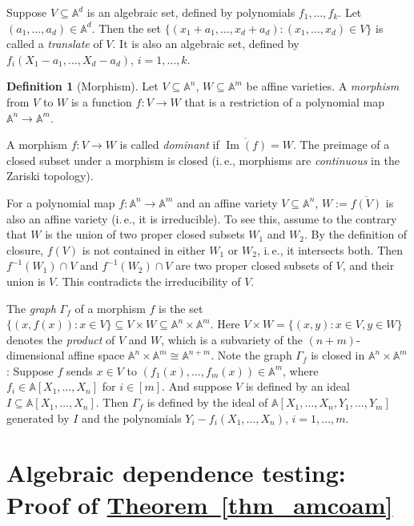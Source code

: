 \documentclass[11pt]{article}
\numberwithin{equation}{section}
\theoremstyle{definition}
\newtheorem{definition}[theorem]{Definition}
\theoremstyle{plain}
\newcommand{\ie}{i.\,e.}
\newcommand{\expref}[2]{\hyperref[#2]{#1~\ref{#2}}}
\newcommand{\aff}{\mathbb{A}}
\DeclareMathOperator{\im}{\mathrm{Im}}
\begin{document}
%
Suppose $V\subseteq\aff^d$ is an algebraic set, defined by polynomials $f_1,\dots,f_k$. Let $(a_1,\dots,a_d)\in\aff^d$. Then the set $\{(x_1+a_1,\dots,x_d+a_d): (x_1,\dots,x_d)\in V\}$ is called a \emph{translate} of $V$. It is also an algebraic set, defined by $f_i(X_1-a_1,\dots,X_d-a_d)$, $i=1,\dots,k$.

%
\begin{definition}[Morphism] %
Let $V\subseteq \aff^n$, $W\subseteq\aff^m$ be affine varieties. A \emph{morphism} from $V$ to $W$ is a function $f:V\to W$ that is a restriction of a polynomial map $\aff^n\to\aff^m$.
\end{definition}

A morphism $f: V\to W$ is called \emph{dominant} if $\overline{\im(f)}=W$.
The preimage of a closed subset under a morphism is closed (\ie, morphisms are \emph{continuous} in the Zariski topology).

For a polynomial map $f:\aff^n\to\aff^m$ and an affine variety $V\subseteq \aff^n$, $W:=\overline{f(V)}$ is also an affine variety (\ie, it is irreducible). To see this, assume to the contrary that $W$ is the union of two proper closed subsets $W_1$ and $W_2$. By the definition of closure, $f(V)$ is not contained in either $W_1$ or $W_2$, \ie, it intersects both. Then $f^{-1}(W_1)\cap V$ and $f^{-1}(W_2)\cap V$ are two proper closed subsets of $V$, and their union is $V$. This contradicts the irreducibility of $V$.

%
The \emph{graph} $\Gamma_f$ of a morphism $f$ is the set $\{(x,f(x)): x\in V\}\subseteq V\times W\subseteq \aff^n\times \aff^m$.
Here $V\times W=\{(x,y): x\in V,y\in W\}$ denotes the \emph{product} of $V$ and $W$, which is a subvariety of the $(n+m)$-dimensional affine space $\aff^n\times \aff^m\cong \aff^{n+m}$.
Note the graph $\Gamma_f$ is closed in $\aff^n\times \aff^m$: 
Suppose $f$ sends $x\in V$ to $(f_1(x),\dots,f_m(x))\in\aff^m$, where $f_i\in\aff[X_1,\dots,X_n]$ for $i\in [m]$.
And suppose $V$ is defined by an ideal $I\subseteq \aff[X_1,\dots,X_n]$. Then $\Gamma_f$ is defined by the ideal of $\aff[X_1,\dots,X_n,Y_1,\dots,Y_m]$ generated by $I$ and the polynomials $Y_i-f_i(X_1,\dots,X_n)$, $i=1,\dots,m$. 

%

\section{Algebraic dependence testing: Proof of \expref{Theorem}{thm_amcoam} }\label{sec-dep}
%
\end{document}
